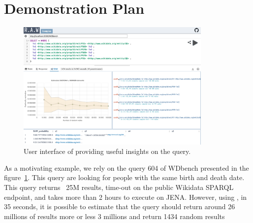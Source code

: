 




\section{Demonstration Plan}

 \begin{figure}
   \centering
   \includegraphics[width=0.85\textwidth]{figures/raw_screenshot.png}
   \caption{\label{fig:raw_screenshot}User interface of \NAME providing useful insights on the query.}
 \end{figure}


 As a motivating example, we rely on the query 604 of
 WDbench\cite{angles2022wdbench} presented in the
 figure~\ref{fig:raw_screenshot}. This query are looking for people
 with the same birth and death date. This query returns ~25M results,
 time-out on the public Wikidata SPARQL endpoint, and takes more than
 2 hours to execute on JENA. However, using \NAME, in 35 seconds, it
 is possible to estimate that the query should return around 26
 millions of results more or less 3 millions and return 1434 random
 results

